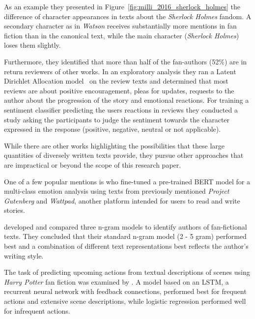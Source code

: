 As an example they presented in Figure~\ref{fig:milli_2016_sherlock_holmes} the difference of character appearances in texts about the \emph{Sherlock Holmes} fandom.
A secondary character as in \emph{Watson} receives substantially more mentions in fan fiction than in the canonical text, while the main character (\emph{Sherlock Holmes}) loses them slightly.

Furthermore, they identified that more than half of the fan-authors (52\%) are in return reviewers of other works.
In an exploratory analysis they ran a Latent Dirichlet Allocation model~\citep{Blei2003LatentAllocation} on the review texts and determined that most reviews are about positive encouragement, pleas for updates, requests to the author about the progression of the story and emotional reactions.
For training a sentiment classifier predicting the users reactions in reviews they conducted a study asking the participants to judge the sentiment towards the character expressed in the response (positive, negative, neutral or not applicable).


While there are other works highlighting the possibilities that these large quantities of diversely written texts provide, they pursue other approaches that are impractical or beyond the scope of this research paper.

One of a few popular mentions is \citet{Liu2019DENS:Analysis} who fine-tuned a pre-trained BERT model for a multi-class emotion analysis using texts from previously mentioned \emph{Project Gutenberg} and \emph{Wattpad}, another platform intended for users to read and write stories.

\citet{Muttenthaler2019AuthorshipN-grams} developed and compared three n-gram models to identify authors of fan-fictional texts.
They concluded that their standard n-gram model (2 - 5 gram) performed best and a combination of different text representations best reflects the author's writing style.

The task of predicting upcoming actions from textual descriptions of scenes using \emph{Harry Potter} fan fiction was examined by \citet{Vilares2019HarryLanguage}.
A model based on an LSTM, a recurrent neural network with feedback connections, performed best for frequent actions and extensive scene descriptions, while logistic regression performed well for infrequent actions.

